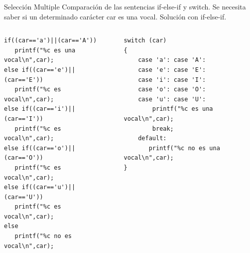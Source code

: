 \begin{frame}[fragile]{Selección Multiple}
Comparación de las sentencias if-else-if y switch. Se necesita saber si un determinado
carácter car es una vocal. Solución con if-else-if.
\vspace{2mm}
    \begin{columns}
        \begin{column}{0.4 \textwidth}
            \begin{lstlisting}[basicstyle=\ttfamily\tiny]
if((car=='a')||(car=='A'))
   printf("%c es una vocal\n",car);
else if((car=='e')||(car=='E'))
   printf("%c es vocal\n",car);
else if((car=='i')||(car=='I'))
   printf("%c es vocal\n",car);
else if((car=='o')||(car=='O'))
   printf("%c es vocal\n",car);
else if((car=='u')||(car=='U'))
   printf("%c es vocal\n",car);
else
   printf("%c no es vocal\n",car);
\end{lstlisting}
        \end{column}
        \begin{column}{0.5 \textwidth}
            \begin{lstlisting}[basicstyle=\ttfamily\tiny]
switch (car)
{
    case 'a': case 'A':
    case 'e': case 'E':
    case 'i': case 'I':
    case 'o': case 'O':
    case 'u': case 'U':
        printf("%c es una vocal\n",car);
        break;
    default:
       printf("%c no es una vocal\n",car);
}
\end{lstlisting}
        \end{column}
    \end{columns}

\end{frame}